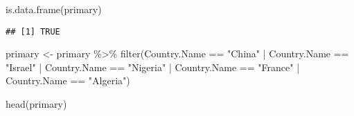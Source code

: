 \documentclass[
]{article}
\newenvironment{Shaded}{\begin{snugshade}}{\end{snugshade}}
\newcommand{\FunctionTok}[1]{\textcolor[rgb]{0.00,0.00,0.00}{#1}}
\newcommand{\NormalTok}[1]{#1}
\newcommand{\OtherTok}[1]{\textcolor[rgb]{0.56,0.35,0.01}{#1}}
\newcommand{\SpecialCharTok}[1]{\textcolor[rgb]{0.00,0.00,0.00}{#1}}
\newcommand{\StringTok}[1]{\textcolor[rgb]{0.31,0.60,0.02}{#1}}
\begin{document}
\begin{Shaded}
\begin{Highlighting}[]
\FunctionTok{is.data.frame}\NormalTok{(primary)}
\end{Highlighting}
\end{Shaded}

\begin{verbatim}
## [1] TRUE
\end{verbatim}

\begin{Shaded}
\begin{Highlighting}[]
\NormalTok{primary }\OtherTok{\textless{}{-}}\NormalTok{ primary }\SpecialCharTok{\%\textgreater{}\%}
  \FunctionTok{filter}\NormalTok{(Country.Name }\SpecialCharTok{==} \StringTok{"China"} \SpecialCharTok{|}\NormalTok{ Country.Name }\SpecialCharTok{==} \StringTok{"Israel"} \SpecialCharTok{|}\NormalTok{ Country.Name }\SpecialCharTok{==} \StringTok{"Nigeria"} \SpecialCharTok{|}\NormalTok{ Country.Name }\SpecialCharTok{==} \StringTok{"France"} \SpecialCharTok{|}\NormalTok{ Country.Name }\SpecialCharTok{==} \StringTok{"Algeria"}\NormalTok{)}
\end{Highlighting}
\end{Shaded}

\begin{Shaded}
\begin{Highlighting}[]
\FunctionTok{head}\NormalTok{(primary)}
\end{Highlighting}
\end{Shaded}
\end{document}
